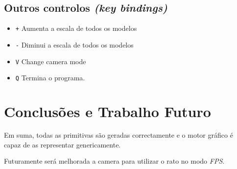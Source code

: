 \documentclass[a4paper]{article}
\begin{document}
\subsection{Outros controlos \textit{(key bindings)}}

\begin{itemize}
    \item \texttt{+} Aumenta a escala de todos os modelos
    \item \texttt{-} Diminui a escala de todos os modelos
    \item \texttt{V} Change camera mode
    \item \texttt{Q} Termina o programa.
\end{itemize}

\section{Conclusões e Trabalho Futuro}
Em suma, todas as primitivas são geradas correctamente e o motor gráfico é capaz de as representar genericamente.

Futuramente será melhorada a camera para utilizar o rato no modo \textit{FPS}.
\end{document}
